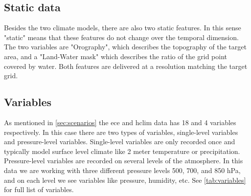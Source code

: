 \subsection{Static data}
Besides the two climate models, there are also two static features. In this sense "static" means that these features do not change over the temporal dimension. The two variables are "Orography", which describes the topography of the target area, and a "Land-Water mask" which describes the ratio of the grid point covered by water. Both features are delivered at a resolution matching the target grid.

\subsection{Variables}
As mentioned in \autoref{sec:scenarios} the \gls{ece} and \gls{hclim} data has 18 and 4 variables respectively. In this case there are two types of variables, single-level variables and pressure-level variables. Single-level variables are only recorded once and typically model surface level climate like 2 meter temperature or precipitation. Pressure-level variables are recorded on several levels of the atmosphere. In this data we are working with three different pressure levels 500, 700, and 850 hPa, and on each level we see variables like pressure, humidity, etc. See \autoref{tab:variables} for full list of variables. 

